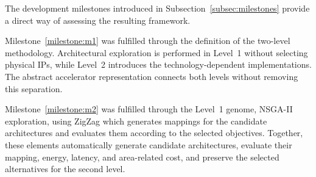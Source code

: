 The development milestones introduced in Subsection~\ref{subsec:milestones} provide a
direct way of assessing the resulting framework.

Milestone~\ref{milestone:m1} was fulfilled through the definition of the
two-level methodology. Architectural exploration is performed in
Level~1 without selecting physical IPs, while Level~2 introduces the
technology-dependent implementations. The abstract accelerator
representation connects both levels without removing this separation.

Milestone~\ref{milestone:m2} was fulfilled through the Level~1 genome,
NSGA-II exploration, using ZigZag which generates mappings for the
candidate architectures and evaluates them according to the selected
objectives. Together, these elements
automatically generate candidate architectures, evaluate their
mapping, energy, latency, and area-related cost, and preserve the
selected alternatives for the second level.
